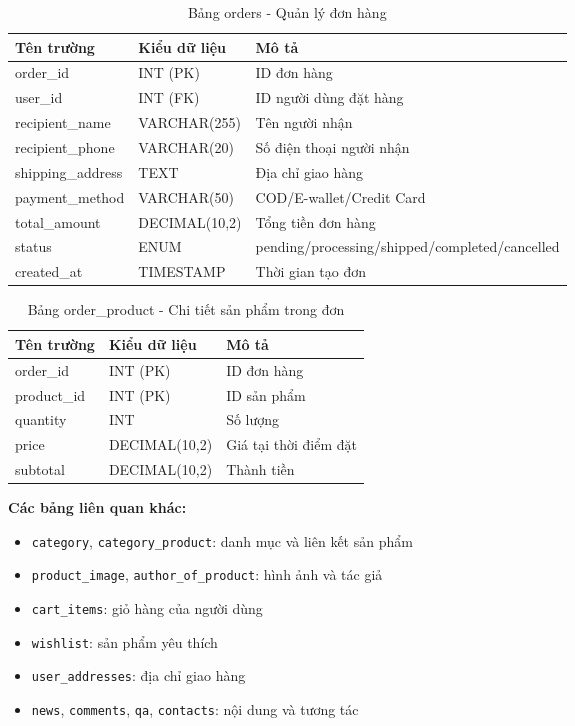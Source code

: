 \begin{table}[H]
\centering
\begin{tabular}{|l|l|l|}
\hline
\textbf{Tên trường} & \textbf{Kiểu dữ liệu} & \textbf{Mô tả} \\
\hline
order\_id & INT (PK) & ID đơn hàng \\
user\_id & INT (FK) & ID người dùng đặt hàng \\
recipient\_name & VARCHAR(255) & Tên người nhận \\
recipient\_phone & VARCHAR(20) & Số điện thoại người nhận \\
shipping\_address & TEXT & Địa chỉ giao hàng \\
payment\_method & VARCHAR(50) & COD/E-wallet/Credit Card \\
total\_amount & DECIMAL(10,2) & Tổng tiền đơn hàng \\
status & ENUM & pending/processing/shipped/completed/cancelled \\
created\_at & TIMESTAMP & Thời gian tạo đơn \\
\hline
\end{tabular}
\caption{Bảng orders - Quản lý đơn hàng}
\label{tab:orders}
\end{table}

\begin{table}[H]
\centering
\begin{tabular}{|l|l|l|}
\hline
\textbf{Tên trường} & \textbf{Kiểu dữ liệu} & \textbf{Mô tả} \\
\hline
order\_id & INT (PK) & ID đơn hàng \\
product\_id & INT (PK) & ID sản phẩm \\
quantity & INT & Số lượng \\
price & DECIMAL(10,2) & Giá tại thời điểm đặt \\
subtotal & DECIMAL(10,2) & Thành tiền \\
\hline
\end{tabular}
\caption{Bảng order\_product - Chi tiết sản phẩm trong đơn}
\label{tab:order_product}
\end{table}

\textbf{Các bảng liên quan khác:}
\begin{itemize}
    \item \texttt{category}, \texttt{category\_product}: danh mục và liên kết sản phẩm
    \item \texttt{product\_image}, \texttt{author\_of\_product}: hình ảnh và tác giả
    \item \texttt{cart\_items}: giỏ hàng của người dùng
    \item \texttt{wishlist}: sản phẩm yêu thích
    \item \texttt{user\_addresses}: địa chỉ giao hàng
    \item \texttt{news}, \texttt{comments}, \texttt{qa}, \texttt{contacts}: nội dung và tương tác
\end{itemize}


